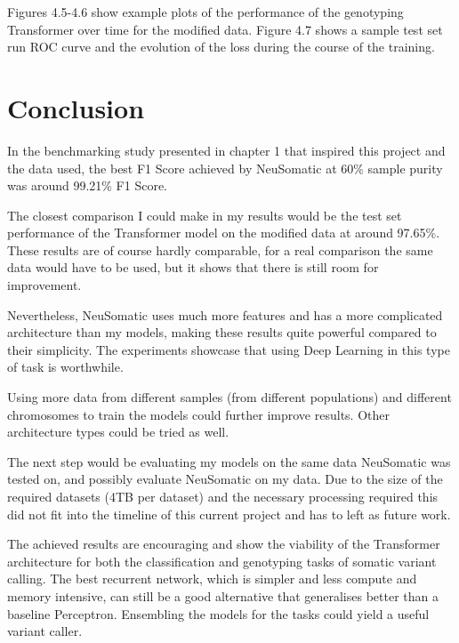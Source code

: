 \documentclass[bsc,frontabs,singlespacing,parskip,deptreport]{infthesis}
\begin{document}
Figures 4.5-4.6 show example plots of the performance of the genotyping Transformer over time for the modified data. Figure 4.7 shows a sample test set run ROC curve and the evolution of the loss during the course of the training.

\section{Conclusion}

In the benchmarking study presented in chapter 1 \cite{benchmark} that inspired this project and the data used, the best F1 Score achieved by NeuSomatic \cite{neusomatic} at 60\% sample purity was around 99.21\% F1 Score. 

The closest comparison I could make in my results would be the test set performance of the Transformer model on the modified data at around 97.65\%. These results are of course hardly comparable, for a real comparison the same data would have to be used, but it shows that there is still room for improvement.

Nevertheless, NeuSomatic uses much more features and has a more complicated architecture than my models, making these results quite powerful compared to their simplicity. The experiments showcase that using Deep Learning in this type of task is worthwhile.

Using more data from different samples (from different populations) and different chromosomes to train the models could further improve results. Other architecture types could be tried as well. 

The next step would be evaluating my models on the same data NeuSomatic was tested on, and possibly evaluate NeuSomatic on my data. Due to the size of the required datasets (4TB per dataset) and the necessary processing required this did not fit into the timeline of this current project and has to left as future work.

The achieved results are encouraging and show the viability of the Transformer architecture for both the classification and genotyping tasks of somatic variant calling. The best recurrent network, which is simpler and less compute and memory intensive, can still be a good alternative that generalises better than a baseline Perceptron. Ensembling the models for the tasks could yield a useful variant caller.





%
%
%
\end{document}
